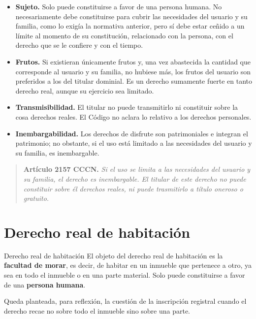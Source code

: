 \documentclass[12pt,oneside]{book}
\begin{document}
\begin{itemize}
    \item \textbf{Sujeto.} Solo puede constituirse a favor de una persona humana. No necesariamente debe constituirse para cubrir las necesidades del usuario y su familia, como lo exigía la normativa anterior, pero sí debe estar ceñido a un límite al momento de su constitución, relacionado con la persona, con el derecho que se le confiere y con el tiempo.
    \item \textbf{Frutos.} Si existieran únicamente frutos y, una vez abastecida la cantidad que corresponde al usuario y su familia, no hubiese más, los frutos del usuario son preferidos a los del titular dominial. Es un derecho sumamente fuerte en tanto derecho real, aunque su ejercicio sea limitado.
    \item \textbf{Transmisibilidad.} El titular no puede transmitirlo ni constituir sobre la cosa derechos reales. El Código no aclara lo relativo a los derechos personales.
    \item \textbf{Inembargabilidad.} Los derechos de disfrute son patrimoniales e integran el patrimonio; no obstante, si el uso está limitado a las necesidades del usuario y su familia, es inembargable.
\end{itemize}

\begin{quote}
\textbf{Artículo 2157 CCCN.} \textit{Si el uso se limita a las necesidades del usuario y su familia, el derecho es inembargable. El titular de este derecho no puede constituir sobre él derechos reales, ni puede trasmitirlo a título oneroso o gratuito.}
\end{quote}

\section{Derecho real de habitación}

\begin{definition}{Derecho real de habitación}
El objeto del derecho real de habitación es la \textbf{facultad de morar}, es decir, de habitar en un inmueble que pertenece a otro, ya sea en todo el inmueble o en una parte material. Solo puede constituirse a favor de una \textbf{persona humana}.
\end{definition}

\begin{note}
Queda planteada, para reflexión, la cuestión de la inscripción registral cuando el derecho recae no sobre todo el inmueble sino sobre una parte.
\end{note}
\end{document}

